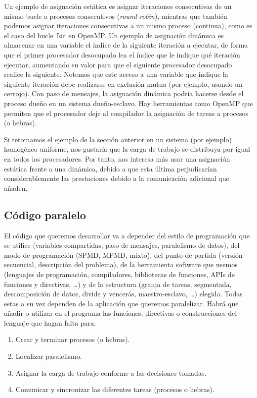 Un ejemplo de asignación estática es asignar iteraciones consecutivas de un mismo bucle a procesos consecutivos (\textit{round-robin}), mientras que también podemos asignar iteraciones consecutivas a un mismo proceso (continua), como es el caso del bucle \verb|for| en OpenMP\@. Un ejemplo de asignación dinámica es almacenar en una variable el índice de la siguiente iteración a ejecutar, de forma que el primer procesador desocupado lea el índice que le indique qué iteración ejecutar, aumentando su valor para que el siguiente procesador desocupado realice la siguiente. Notemos que este acceso a una variable que indique la siguiente iteración debe realizarse en exclusión mutua (por ejemplo, usando un cerrojo). Con paso de mensajes, la asignación dinámica podría hacerse desde el proceso dueño en un sistema dueño-esclavo. Hay herramientas como OpenMP que permiten que el procesador deje al compilador la asignación de tareas a procesos (o hebras).

\begin{ejemplo}
    Si retomamos el ejemplo de la sección anterior en un sistema (por ejemplo) homogéneo uniforme, nos gustaría que la carga de trabajo se distribuya por igual en todos los procesadores. Por tanto, nos interesa más usar una asignación estática frente a una dinámica, debido a que esta última perjudicarían considerablemente las prestaciones debido a la comunicación adicional que añaden.
\end{ejemplo}
\subsection{Código paralelo}
El código que queremos desarrollar va a depender del estilo de programación que se utilice (variables compartidas, paso de mensajes, paralelismo de datos), del modo de programación (SPMD, MPMD, mixto), del punto de partida (versión secuencial, descripción del problema), de la herramienta software que usemos (lenguajes de programación, compiladores, bibliotecas de funciones, APIs de funciones y directivas, \ldots) y de la estructura (granja de tareas, segmentada, descomposición de datos, divide y vencerás, maestro-esclavo, \ldots) elegida. Todas estas a su vez dependen de la aplicación que queremos paralelizar.
Habrá que añadir o utilizar en el programa las funciones, directivas o construcciones del lenguaje que hagan falta para:
\begin{enumerate}
    \item Crear y terminar procesos (o hebras).
    \item Localizar paralelismo.
    \item Asignar la carga de trabajo conforme a las decisiones tomadas.
    \item Comunicar y sincronizar las diferentes tareas (procesos o hebras).
\end{enumerate}

